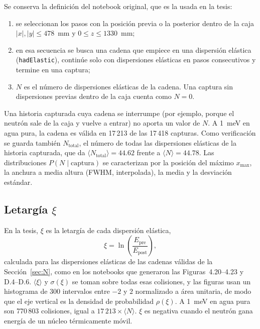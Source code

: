 \documentclass[11pt,a4paper]{article}
\newcommand{\archivo}[1]{\path{#1}}
\newcommand{\var}[1]{\texttt{#1}}
\begin{document}
Se conserva la definición del notebook original, que es la usada en la tesis:

\begin{enumerate}
  \item se seleccionan los pasos con la posición previa o la posterior dentro de la caja $|x|,|y|\le478$~mm y $0\le z\le1330$~mm;
  \item en esa secuencia se busca una cadena que empiece en una dispersión elástica (\var{hadElastic}), continúe solo con dispersiones elásticas en pasos consecutivos y termine en una captura;
  \item $N$ es el número de dispersiones elásticas de la cadena. Una captura sin dispersiones previas dentro de la caja cuenta como $N = 0$.
\end{enumerate}

Una historia capturada cuya cadena se interrumpe (por ejemplo, porque el neutrón sale de la caja y vuelve a entrar) no aporta un valor de $N$. A 1~meV en agua pura, la cadena es válida en 17\,213 de las 17\,418 capturas. Como verificación se guarda también $N_\mathrm{total}$, el número de todas las dispersiones elásticas de la historia capturada, que da $\langle N_\mathrm{total}\rangle = 44.62$ frente a $\langle N\rangle = 44.78$. Las distribuciones $P(N\mid\text{captura})$ se caracterizan por la posición del máximo $x_\mathrm{max}$, la anchura a media altura (FWHM, interpolada), la media y la desviación estándar.

\subsection{Letargía $\xi$}
\label{sec:xi}

En la tesis, $\xi$ es la letargía de cada dispersión elástica,
\begin{equation}
\xi = \ln\!\left(\frac{E_\mathrm{pre}}{E_\mathrm{post}}\right),
\end{equation}
calculada para las dispersiones elásticas de las cadenas válidas de la Sección~\ref{sec:N}, como en los notebooks \archivo{Histogramas_cita_*.ipynb} que generaron las Figuras~4.20--4.23 y D.4--D.6. $\langle\xi\rangle$ y $\sigma(\xi)$ se toman sobre todas esas colisiones, y las figuras usan un histograma de 300 intervalos entre $-2$ y $2$ normalizado a área unitaria, de modo que el eje vertical es la densidad de probabilidad $\rho(\xi)$. A 1~meV en agua pura son 770\,803 colisiones, igual a $17\,213\times\langle N\rangle$. $\xi$ es negativa cuando el neutrón gana energía de un núcleo térmicamente móvil.
\end{document}
